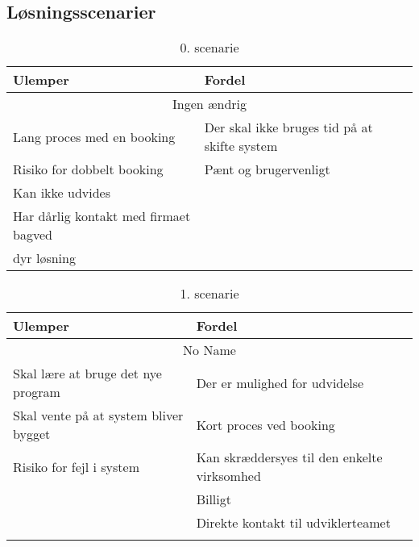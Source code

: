 \subsection{Løsningsscenarier}


\begin{table}[H]
\caption{0. scenarie}
\label{0scenarie}
\begin{tabular}{|l|l|}
\hline
Ulemper                               & \cellcolor[HTML]{C0C0C0}Fordel                                       \\ \hline
\multicolumn{2}{|c|}{Ingen ændrig}                                                                           \\ \hline
Lang proces med en booking            & \cellcolor[HTML]{C0C0C0}Der skal ikke bruges tid på at skifte system \\ \hline
Risiko for dobbelt booking            & \cellcolor[HTML]{C0C0C0}Pænt og brugervenligt                        \\ \hline
Kan ikke udvides                      & \cellcolor[HTML]{C0C0C0}                                             \\ \hline
Har dårlig kontakt med firmaet bagved & \cellcolor[HTML]{C0C0C0}                                             \\ \hline
dyr løsning                           & \cellcolor[HTML]{C0C0C0}                                             \\ \hline
\end{tabular}
\end{table}


\begin{table}[H]
\caption{1. scenarie}
\label{1scenarie}
\begin{tabular}{|l|l|}
\hline
Ulemper                               & \cellcolor[HTML]{C0C0C0}Fordel                                               \\ \hline
\multicolumn{2}{|c|}{No Name}                                                                                        \\ \hline
Skal lære at bruge det nye program   & \cellcolor[HTML]{C0C0C0}Der er mulighed for udvidelse                        \\ \hline
Skal vente på at system bliver bygget & \cellcolor[HTML]{C0C0C0}Kort proces ved booking                              \\ \hline
Risiko for fejl i system              & \cellcolor[HTML]{C0C0C0}Kan skræddersyes til den enkelte virksomhed          \\ \hline
                                      & \cellcolor[HTML]{C0C0C0}Billigt                                              \\ \hline
                                      & \cellcolor[HTML]{C0C0C0}Direkte kontakt til udviklerteamet                    \\ \hline
                                      & \cellcolor[HTML]{C0C0C0}{\color[HTML]{333333} Brugervenligt og overskueligt} \\ \hline
\end{tabular}
\end{table}

